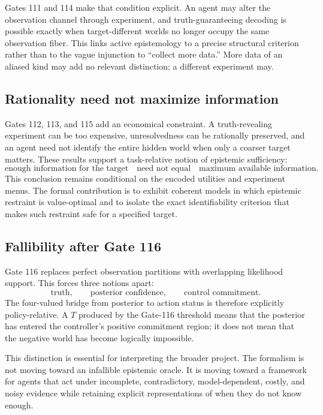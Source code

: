 Gates 111 and 114 make that condition explicit. An agent may alter the observation channel through experiment, and truth-guaranteeing decoding is possible exactly when target-different worlds no longer occupy the same observation fiber. This links active epistemology to a precise structural criterion rather than to the vague injunction to ``collect more data.'' More data of an aliased kind may add no relevant distinction; a different experiment may.

\subsection{Rationality need not maximize information}

Gates 112, 113, and 115 add an economical constraint. A truth-revealing experiment can be too expensive, unresolvedness can be rationally preserved, and an agent need not identify the entire hidden world when only a coarser target matters. These results support a task-relative notion of epistemic sufficiency:
\[
\text{enough information for the target}
\quad\text{need not equal}\quad
\text{maximum available information}.
\]
This conclusion remains conditional on the encoded utilities and experiment menus. The formal contribution is to exhibit coherent models in which epistemic restraint is value-optimal and to isolate the exact identifiability criterion that makes such restraint safe for a specified target.

\subsection{Fallibility after Gate 116}

Gate 116 replaces perfect observation partitions with overlapping likelihood support. This forces three notions apart:
\[
\text{truth},
\qquad
\text{posterior confidence},
\qquad
\text{control commitment}.
\]
The four-valued bridge from posterior to action status is therefore explicitly policy-relative. A $T$ produced by the Gate-116 threshold means that the posterior has entered the controller's positive commitment region; it does not mean that the negative world has become logically impossible.

This distinction is essential for interpreting the broader project. The formalism is not moving toward an infallible epistemic oracle. It is moving toward a framework for agents that act under incomplete, contradictory, model-dependent, costly, and noisy evidence while retaining explicit representations of when they do not know enough.

